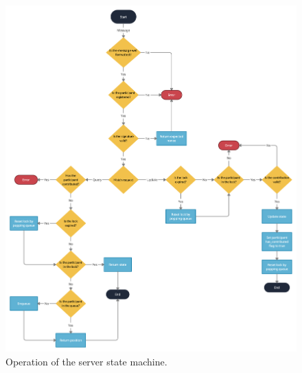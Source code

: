 \begin{figure}
    \caption{Operation of the server state machine.}\label{fig: server}
    \includegraphics[width = \textwidth]{diagrams/server-state-machine.png}
\end{figure}
    